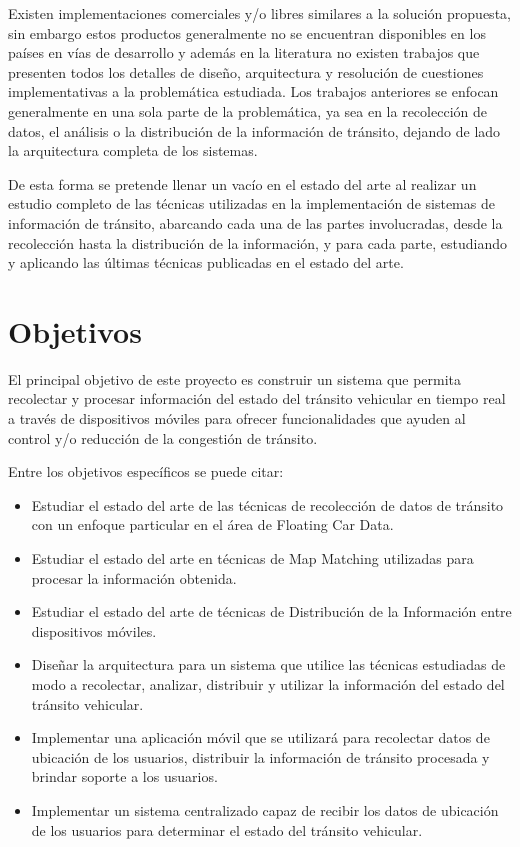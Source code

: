 Existen implementaciones comerciales y/o libres similares a la solución propuesta, sin embargo estos productos generalmente no se encuentran disponibles en los países en vías de desarrollo y además en la literatura no existen trabajos que presenten todos los detalles de diseño, arquitectura y resolución de cuestiones implementativas a la problemática estudiada. Los trabajos anteriores se enfocan generalmente en una sola parte de la problemática, ya sea en la recolección de datos, el análisis o la distribución de la información de tránsito, dejando de lado la arquitectura completa de los sistemas.

De esta forma se pretende llenar un vacío en el estado del arte al realizar un estudio completo de las técnicas utilizadas en la implementación de sistemas de información de tránsito, abarcando cada una de las partes involucradas, desde la recolección hasta la distribución de la información, y para cada parte, estudiando y aplicando las últimas técnicas publicadas en el estado del arte.

\section{Objetivos}

El principal objetivo de este proyecto es construir un sistema que permita recolectar y procesar información del estado del tránsito vehicular en tiempo real a través de dispositivos móviles para ofrecer funcionalidades que ayuden al control y/o reducción de la congestión de tránsito.

Entre los objetivos específicos se puede citar:

\begin{itemize}

\item Estudiar el estado del arte de las técnicas de recolección de datos de tránsito con un enfoque particular en el área de Floating Car Data.

\item Estudiar el estado del arte en técnicas de Map Matching utilizadas para procesar la información obtenida.

\item Estudiar el estado del arte de técnicas de Distribución de la Información entre dispositivos móviles.

\item Diseñar la arquitectura para un sistema que utilice las técnicas estudiadas de modo a recolectar, analizar, distribuir y utilizar la información del estado del tránsito vehicular.

\item Implementar una aplicación móvil que se utilizará para recolectar datos de ubicación de los usuarios, distribuir la información de tránsito procesada y brindar soporte a los usuarios.

\item Implementar un sistema centralizado capaz de recibir los datos de ubicación de los usuarios para determinar el estado del tránsito vehicular.

\end{itemize}

